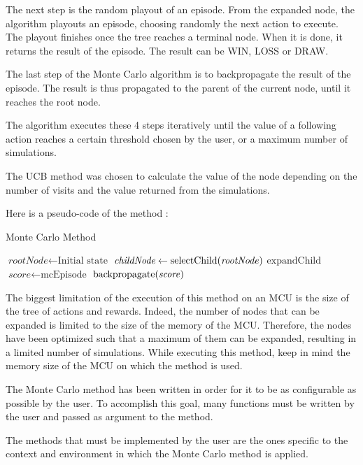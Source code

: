 \documentclass{book}
\begin{document}
The next step is the random playout of an episode. From the expanded node, the algorithm playouts an episode, choosing randomly the next action to execute. The playout finishes once the tree reaches a terminal node. When it is done, it returns the result of the episode. The result can be WIN, LOSS or DRAW.

The last step of the Monte Carlo algorithm is to backpropagate the result of the episode. The result is thus propagated to the parent of the current node, until it reaches the root node.

The algorithm executes these 4 steps iteratively until the value of a following action reaches a certain threshold chosen by the user, or a maximum number of simulations. 

The UCB method was chosen to calculate the value of the node depending on the number of visits and the value returned from the simulations.

Here is a pseudo-code of the method :

\begin{algorithm}
  \caption{Monte Carlo Method}
  \begin{algorithmic}[1]
    \State $\textit{rootNode} \gets \text{Initial state}$
   
    \State $\textit{childNode} \gets \text{selectChild(\textit{rootNode})}$
    \State $\text{expandChild}$
    \State $\textit{score} \gets\text{mcEpisode}$
    \State $\text{backpropagate(\textit{score})}$
  \EndWhile
  \end{algorithmic}
\end{algorithm}

The biggest limitation of the execution of this method on an MCU is the size of the tree of actions and rewards. Indeed, the number of nodes that can be expanded is limited to the size of the memory of the MCU. Therefore, the nodes have been optimized such that a maximum of them can be expanded, resulting in a limited number of simulations. While executing this method, keep in mind the memory size of the MCU on which the method is used. 

The Monte Carlo method has been written in order for it to be as configurable as possible by the user. To accomplish this goal, many functions must be written by the user and passed as argument to the method. 

The methods that must be implemented by the user are the ones specific to the context and environment in which the Monte Carlo method is applied.
\end{document}
